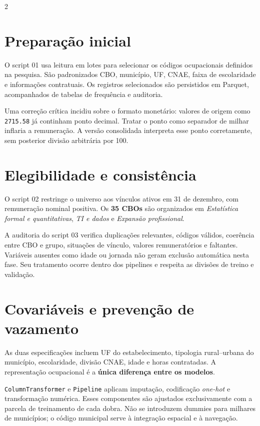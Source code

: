 \documentclass[10pt,a4paper]{article}
\begin{document}
\vspace{3mm}
\begin{multicols}{2}\raggedcolumns
\section{Preparação inicial}
O script 01 usa leitura em lotes para selecionar os códigos ocupacionais definidos na pesquisa. São padronizados CBO, município, UF, CNAE, faixa de escolaridade e informações contratuais. Os registros selecionados são persistidos em Parquet, acompanhados de tabelas de frequência e auditoria.

Uma correção crítica incidiu sobre o formato monetário: valores de origem como \texttt{2715.58} já continham ponto decimal. Tratar o ponto como separador de milhar inflaria a remuneração. A versão consolidada interpreta esse ponto corretamente, sem posterior divisão arbitrária por 100.

\section{Elegibilidade e consistência}
O script 02 restringe o universo aos vínculos ativos em 31 de dezembro, com remuneração nominal positiva. Os \textbf{35 CBOs} são organizados em \emph{Estatística formal e quantitativas}, \emph{TI e dados} e \emph{Expansão profissional}.

A auditoria do script 03 verifica duplicações relevantes, códigos válidos, coerência entre CBO e grupo, situações de vínculo, valores remuneratórios e faltantes. Variáveis ausentes como idade ou jornada não geram exclusão automática nesta fase. Seu tratamento ocorre dentro dos pipelines e respeita as divisões de treino e validação.

\section{Covariáveis e prevenção de vazamento}
As duas especificações incluem UF do estabelecimento, tipologia rural--urbana do município, escolaridade, divisão CNAE, idade e horas contratadas. A representação ocupacional é a \textbf{única diferença entre os modelos}.

\texttt{ColumnTransformer} e \texttt{Pipeline} aplicam imputação, codificação \emph{one-hot} e transformação numérica. Esses componentes são ajustados exclusivamente com a parcela de treinamento de cada dobra. Não se introduzem dummies para milhares de municípios; o código municipal serve à integração espacial e à navegação.


\end{multicols}
\end{document}
